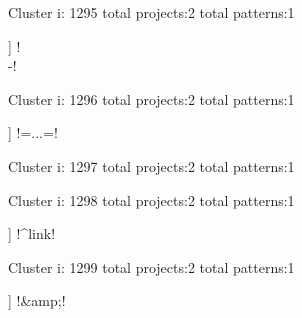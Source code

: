 Cluster i: 1295
total projects:2
total patterns:1
\begin{multicols}{1}
\begin{description}[noitemsep,topsep=0pt]
\item [[2] ] \cverb!\\-!
\end{description}
\end{multicols}







Cluster i: 1296
total projects:2
total patterns:1
\begin{multicols}{1}
\begin{description}[noitemsep,topsep=0pt]
\item [[2] ] \cverb!=...=!
\end{description}
\end{multicols}







Cluster i: 1297
total projects:2
total patterns:1
\begin{multicols}{1}
\end{multicols}







Cluster i: 1298
total projects:2
total patterns:1
\begin{multicols}{1}
\begin{description}[noitemsep,topsep=0pt]
\item [[2] ] \cverb!^link!
\end{description}
\end{multicols}







Cluster i: 1299
total projects:2
total patterns:1
\begin{multicols}{1}
\begin{description}[noitemsep,topsep=0pt]
\item [[2] ] \cverb!&amp;!
\end{description}
\end{multicols}







